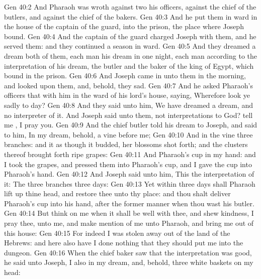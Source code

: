 \vs Gen 40:2 And Pharaoh was wroth against two  his officers, against the chief of the butlers, and against the chief of the bakers.
\vs Gen 40:3 And he put them in ward in the house of the captain of the guard, into the prison, the place where Joseph  bound.
\vs Gen 40:4 And the captain of the guard charged Joseph with them, and he served them: and they continued a season in ward.
\vs Gen 40:5 And they dreamed a dream both of them, each man his dream in one night, each man according to the interpretation of his dream, the butler and the baker of the king of Egypt, which  bound in the prison.
\vs Gen 40:6 And Joseph came in unto them in the morning, and looked upon them, and, behold, they  sad.
\vs Gen 40:7 And he asked Pharaoh's officers that  with him in the ward of his lord's house, saying, Wherefore look ye  sadly to day?
\vs Gen 40:8 And they said unto him, We have dreamed a dream, and  no interpreter of it. And Joseph said unto them,  not interpretations  to God? tell me , I pray you.
\vs Gen 40:9 And the chief butler told his dream to Joseph, and said to him, In my dream, behold, a vine  before me;
\vs Gen 40:10 And in the vine  three branches: and it  as though it budded,  her blossoms shot forth; and the clusters thereof brought forth ripe grapes:
\vs Gen 40:11 And Pharaoh's cup  in my hand: and I took the grapes, and pressed them into Pharaoh's cup, and I gave the cup into Pharaoh's hand.
\vs Gen 40:12 And Joseph said unto him, This  the interpretation of it: The three branches  three days:
\vs Gen 40:13 Yet within three days shall Pharaoh lift up thine head, and restore thee unto thy place: and thou shalt deliver Pharaoh's cup into his hand, after the former manner when thou wast his butler.
\vs Gen 40:14 But think on me when it shall be well with thee, and shew kindness, I pray thee, unto me, and make mention of me unto Pharaoh, and bring me out of this house:
\vs Gen 40:15 For indeed I was stolen away out of the land of the Hebrews: and here also have I done nothing that they should put me into the dungeon.
\vs Gen 40:16 When the chief baker saw that the interpretation was good, he said unto Joseph, I also  in my dream, and, behold,  three white baskets on my head:

